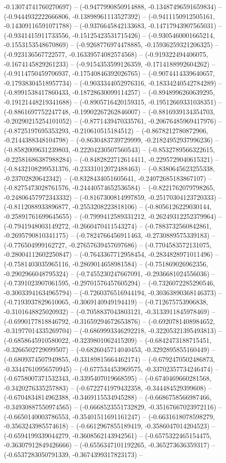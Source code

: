 -0.13074741760270697) -- (-0.9477990850914888, -0.13487496591659834) -- (-0.9444932222666806, -0.13898961113527392) -- (-0.9411150912505161, -0.14309116591071788) -- (-0.9376645842133683, -0.14717943907565031) -- (-0.9341415911733556, -0.15125423531715426) -- (-0.9305460001665214, -0.1553153548670869) -- (-0.9268776974478885, -0.15936259321206325) -- (-0.923136567722577, -0.16339574082574568) -- (-0.919322494406075, -0.1674145829261233) -- (-0.9154353599126359, -0.1714188992604262) -- (-0.9114750459706937, -0.17540846392026765) -- (-0.9074414339640657, -0.17938304518957734) -- (-0.9033344052976316, -0.18334240542784289) -- (-0.8991538417860433, -0.18728630099114257) -- (-0.8948996260639295, -0.19121448219341688) -- (-0.8905716420159315, -0.19512669331038351) -- (-0.8861697752247748, -0.19902267262846007) -- (-0.8816939134354703, -0.20290215254101052) -- (-0.8771439470335761, -0.20676485969417976) -- (-0.8725197695353293, -0.210610515184512) -- (-0.8678212780872906, -0.2144388348104798) -- (-0.8630483739729999, -0.21824952937996236) -- (-0.8582009631239803, -0.22204230507560543) -- (-0.8532789566322615, -0.22581686387988284) -- (-0.8482822712614411, -0.2295729040615321) -- (-0.8432108299531376, -0.23331012072488463) -- (-0.8380645623255338, -0.23702820642342) -- (-0.8328434051605641, -0.24072685183867107) -- (-0.8275473028761576, -0.24440574652536584) -- (-0.8221762079798265, -0.24806457972343332) -- (-0.8167300814997859, -0.25170304123720333) -- (-0.8112088933896877, -0.2553208223818106) -- (-0.8056126229030144, -0.25891761699645655) -- (-0.7999412589331212, -0.26249312252379964) -- (-0.7941948003149272, -0.2660470411543274) -- (-0.7883732560842861, -0.2695790810341175) -- (-0.7824766456911463, -0.2730889575339183) -- (-0.776504999162727, -0.27657639457697686) -- (-0.7704583572131075, -0.28004112602250847) -- (-0.7643367712958454, -0.2834828971011496) -- (-0.7581403035965116, -0.2869014658981584) -- (-0.751869026962356, -0.2902966048795324) -- (-0.7455230247667091, -0.2936681024556036) -- (-0.7391023907061595, -0.29701576457605294) -- (-0.7326072285290546, -0.30033941634965794) -- (-0.7260376516944194, -0.30363890368146373) -- (-0.7193937829610065, -0.3069140949194419) -- (-0.712675753906838, -0.3101648825020932) -- (-0.7058837043803121, -0.3133911845978469) -- (-0.6990177818846792, -0.31659294672653876) -- (-0.6920781408984652, -0.31977014335269704) -- (-0.6869993346292218, -0.32205321395493813) -- (-0.6858645910580022, -0.3239801062415209) -- (-0.6842473188715451, -0.3266502729099507) -- (-0.6826045714040453, -0.3292895855160449) -- (-0.6809374507949855, -0.33189815664462174) -- (-0.6792470502486873, -0.33447610956570945) -- (-0.677534453969575, -0.33702357734246474) -- (-0.6758007371532343, -0.3395407019668595) -- (-0.6740469660281568, -0.3420276335257883) -- (-0.6722741979432358, -0.344484529399608) -- (-0.6704834814962388, -0.3469115534945288) -- (-0.6686758566987466, -0.34930887550974565) -- (-0.6668523551732829, -0.35167667023972116) -- (-0.6650140003786553, -0.35401511691161247) -- (-0.6631618078598279, -0.3563243985574618) -- (-0.6612967855189419, -0.3586047014204523) -- (-0.6594199339044279, -0.3608562143942561) -- (-0.6575322465154475, -0.36307912849426666) -- (-0.6556347101192265, -0.365273636359317) -- (-0.6537283050791339, -0.3674399317823173) -- 